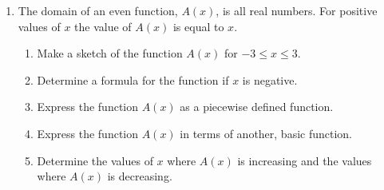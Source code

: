 \begin{enumerate}
\clearpage

\item The domain of an even function, $A(x)$, is all real numbers. For
  positive values of $x$ the value of $A(x)$ is equal to $x$.
  \label{question:1.7:absoluteValue}
  \begin{enumerate}
  \item Make a sketch of the function $A(x)$ for $-3\leq x \leq 3$.
    \vfill
    \vfill
  \item Determine a formula for the function if $x$ is negative.
    \vfill
  \item Express the function $A(x)$ as a piecewise defined function.
    \vfill
  \item Express the function $A(x)$ in terms of another, basic
    function.
    \vfill
  \item Determine the values of $x$ where $A(x)$ is increasing and the
    values where $A(x)$ is decreasing.
    \vfill
  \end{enumerate}


\end{enumerate}
